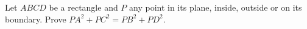 Let $ABCD$ be a rectangle and $P$ any point in its plane, inside, outside or on its boundary. Prove $PA^2+PC^2=PB^2+PD^2$.
